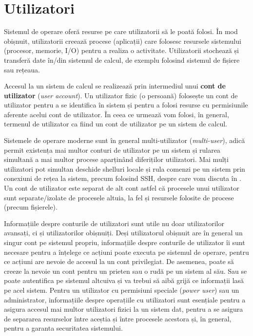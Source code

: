 
\chapter{Utilizatori}
\label{ch:user}

Sistemul de operare oferă resurse pe care utilizatorii să le poată folosi.
În mod obișnuit, utilizatorii creează procese (aplicații) care folosesc resursele sistemului (procesor, memorie, I/O) pentru a realiza o activitate.
Utilizatorii stochează și transferă date în/din sistemul de calcul, de exemplu folosind sistemul de fișiere sau rețeaua.

Accesul la un sistem de calcul se realizează prin intermediul unui \textbf{cont de utilizator} (\textit{user account}).
Un utilizator fizic (o persoană) folosește un cont de utilizator pentru a se identifica în sistem și pentru a folosi resurse cu permisiunile aferente acelui cont de utilizator.
În ceea ce urmează vom folosi, în general, termenul de utilizator ca fiind un cont de utilizator pe un sistem de calcul.

Sistemele de operare moderne sunt în general multi-utilizator (\textit{multi-user}), adică permit existența mai multor conturi de utilizator pe un sistem și rularea simultană a mai multor procese aparținând diferiților utilizatori.
Mai mulți utilizatori pot simultan deschide shelluri locale și rula comenzi pe un sistem prin conexiuni de rețea la sistem, precum folosind SSH, despre care vom discuta în .
Un cont de utilizator este separat de alt cont astfel că procesele unui utilizator sunt separate/izolate de procesele altuia, la fel și resursele folosite de procese (precum fișierele).

Informațiile despre conturile de utilizatori sunt utile nu doar utilizatorilor avansați, ci și utilizatorilor obișnuiți.
Deși utilizatorul obișnuit are în general un singur cont pe sistemul propriu, informațiile despre conturile de utilizator îi sunt necesare pentru a înțelege ce acțiuni poate executa pe sistemul de operare, pentru ce acțiuni are nevoie de accesul la un cont privilegiat.
De asemenea, poate să creeze la nevoie un cont pentru un prieten sau o rudă pe un sistem al său.
Sau se poate autentifica pe sistemul altcuiva și va trebui să aibă grijă ce informații lasă pe acel sistem.
Pentru un utilizator cu permisiuni speciale (\textit{power user}) sau un administrator, informațiile despre operațiile cu utilizatori sunt esențiale pentru a asigura accesul mai multor utilizatori fizici la un sistem dat, pentru a se asigura de separarea resurselor între aceștia și între procesele acestora și, în general, pentru a garanta securitatea sistemului.

